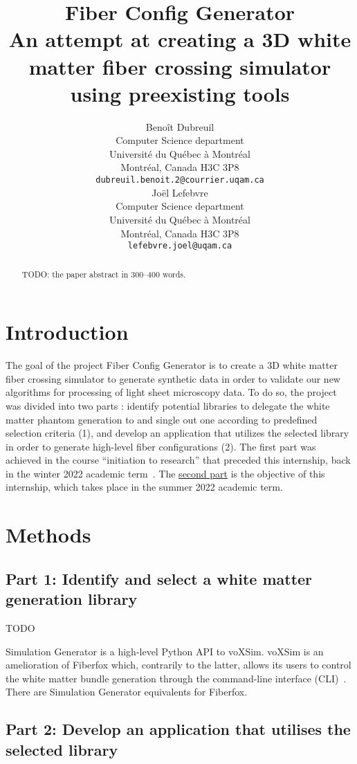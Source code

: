 \documentclass{article}
\title{
  Fiber Config Generator \\
  An attempt at creating a 3D white matter fiber crossing simulator using preexisting tools}
\author{
  Benoît Dubreuil \\
  Computer Science department \\
  Université du Québec à Montréal \\
  Montréal, Canada H3C 3P8 \\
  \texttt{dubreuil.benoit.2@courrier.uqam.ca} \\
  \And
  Joël Lefebvre \\
  Computer Science department\\
  Université du Québec à Montréal \\
  Montréal, Canada H3C 3P8\\
  \texttt{lefebvre.joel@uqam.ca} \\
}
\begin{document}
  \maketitle

  \begin{abstract}
    TODO: the paper abstract in 300--400 words.
  \end{abstract}


  \section{Introduction}\label{sec:introduction}

  The goal of the project Fiber Config Generator is to create a 3D white matter fiber crossing simulator to generate synthetic data in order to validate our new algorithms for processing of light sheet microscopy data.
  To do so, the project was divided into two parts : identify potential libraries to delegate the white matter phantom
  generation to and single out one according to predefined selection criteria (1), and develop an application that utilizes the selected library in order to generate high-level fiber configurations (2).
  The first part was achieved in the course ``initiation to
  research'' that preceded this internship, back in the winter 2022 academic term~\cite{dubreuil2022inf6200}.
  The \href{https://github.com/linum-uqam/inm5803-ete2022-benoit-dubreuil/}{second part} is the objective of this internship, which takes place in the summer 2022 academic term.


  \section{Methods}\label{sec:methodology}

  \subsection{Part 1: Identify and select a white matter generation library}\label{subsec:part-1}

  TODO

  Simulation Generator is a high-level Python API to voXSim.
  voXSim is an amelioration of Fiberfox which, contrarily to the latter, allows its users to control the white matter
  bundle generation through the command-line interface (CLI)~\cite{valcourtcaron2022simulationgenerator}.
  There are Simulation Generator equivalents for Fiberfox.

  \subsection{Part 2: Develop an application that utilises the selected library}\label{subsec:part-2}
\end{document}
